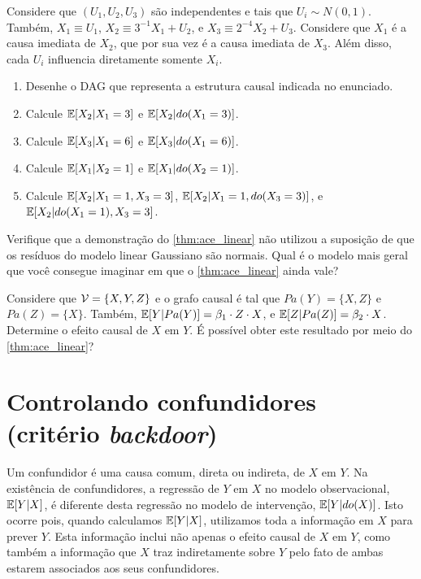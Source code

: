 \begin{exercise}
 Considere que $(U_1, U_2, U_3)$ são independentes e
 tais que $U_i \sim N(0,1)$. Também,
 $X_1 \equiv U_1$,
 $X_2 \equiv 3^{-1}X_1 + U_2$, e
 $X_3 \equiv 2^{-4}X_2 + U_3$.
 Considere que $X_1$ é 
 a causa imediata de $X_2$,
 que por sua vez é a causa imediata de $X_3$.
 Além disso, cada $U_i$ influencia diretamente somente $X_i$.
 \begin{enumerate}[label=(\alph*)]
  \item Desenhe o DAG que representa 
  a estrutura causal indicada no enunciado. 
  \item Calcule ${\mathbb E}[X_2|X_1 = 3]$ e ${\mathbb E}[X_2|do(X_1 = 3)]$.
  \item Calcule ${\mathbb E}[X_3|X_1 = 6]$ e ${\mathbb E}[X_3|do(X_1 = 6)]$.
  \item Calcule ${\mathbb E}[X_1|X_2 = 1]$ e ${\mathbb E}[X_1|do(X_2 = 1)]$.
  \item Calcule ${\mathbb E}[X_2|X_1 = 1, X_3 = 3]$,
  ${\mathbb E}[X_2|X_1 = 1, do(X_3 = 3)]$, e
  ${\mathbb E}[X_2|do(X_1 = 1), X_3 = 3]$.
 \end{enumerate}
 
 \begin{exercise}
  Verifique que a demonstração do \cref{thm:ace_linear} não utilizou a suposição de que os resíduos do modelo linear Gaussiano são normais. Qual é o modelo mais geral que você consegue imaginar em que o \cref{thm:ace_linear} ainda vale?
 \end{exercise}
 
 \begin{exercise}
  Considere que ${\mathcal V} = \{X,Y,Z\}$ e o grafo causal é tal que
  $Pa(Y) = \{X,Z\}$ e $Pa(Z) = \{X\}$. Também,
  ${\mathbb E}[Y|Pa(Y)] = \beta_{1} \cdot Z \cdot X$, e
  ${\mathbb E}[Z|Pa(Z)] = \beta_2 \cdot X$. Determine o efeito causal
  de $X$ em $Y$. É possível obter este resultado por
  meio do \cref{thm:ace_linear}?
 \end{exercise}
 
\end{exercise}

\section{Controlando confundidores (critério \textit{backdoor})}
\label{sec:backdoor}

Um confundidor é uma causa comum, 
direta ou indireta, de $X$ em $Y$.
Na existência de confundidores,
a regressão de $Y$ em $X$ no modelo observacional, 
${\mathbb E}[Y|X]$, é diferente desta regressão
no modelo de intervenção, ${\mathbb E}[Y|do(X)]$.
Isto ocorre pois, quando calculamos ${\mathbb E}[Y|X]$,
utilizamos toda a informação em $X$ para prever $Y$.
Esta informação inclui não apenas 
o efeito causal de $X$ em $Y$, como 
também a informação que $X$ traz indiretamente sobre $Y$ 
pelo fato de ambas estarem associados aos seus confundidores.

